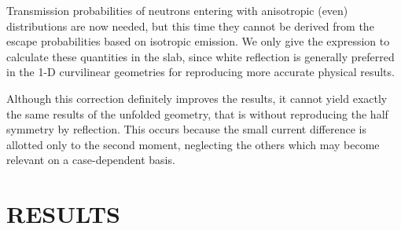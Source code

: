 \documentclass{ictt26}
\begin{document}
Transmission probabilities of neutrons entering with anisotropic (even) distributions are now needed, but this time they cannot be derived from the escape probabilities based on isotropic emission. We only give the expression to calculate these quantities in the slab, since white reflection is generally preferred in the 1-D curvilinear geometries for reproducing more accurate physical results.

Although this correction definitely improves the results, it cannot yield exactly the same results of the unfolded geometry, that is without reproducing the half symmetry by reflection. This occurs because the small current difference is allotted only to the second moment, neglecting the others which may become relevant on a case-dependent basis.


\section{RESULTS}
\label{sec:res}
\end{document}

